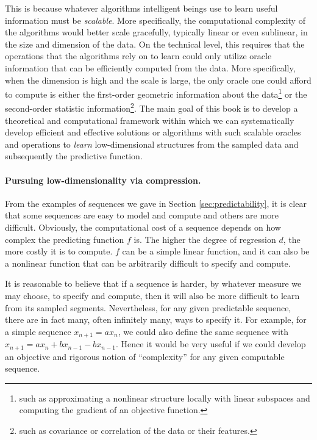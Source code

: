 \documentclass[../../book-main.tex]{subfiles}
\begin{document}
This is because whatever algorithms intelligent beings use to learn useful information must be {\em scalable}. More specifically, the computational complexity of the algorithms would better scale gracefully, typically linear or even sublinear, in the size and dimension of the data. On the technical level, this requires that the operations that the algorithms rely on to learn could only utilize oracle information that can be efficiently computed from the data. More specifically, when the dimension is high and the scale is large, the only oracle one could afford to compute is either the first-order geometric information about the data\footnote{such as approximating a nonlinear structure locally with linear subspaces and computing the gradient of an objective function.} or the second-order statistic information\footnote{such as covariance or correlation of the data or their features.}.
The main goal of this book is to develop a theoretical and computational framework within which we can systematically develop efficient and effective solutions or algorithms with such scalable oracles and operations to {\em learn} low-dimensional structures from the sampled data and subsequently the predictive function.


\paragraph{Pursuing low-dimensionality via compression.}
From the examples of sequences we gave in Section \ref{sec:predictability}, it is clear that some sequences are easy to model and compute and others are more difficult. Obviously, the computational cost of a sequence depends on how complex the predicting function $f$ is. The higher the degree of regression $d$, the more costly it is to compute. $f$ can be a simple linear function, and it can also be a nonlinear function that can be arbitrarily difficult to specify and compute. 

It is reasonable to believe that if a sequence is harder, by whatever measure we may choose, to specify and compute, then it will also be more difficult to learn from its sampled segments. Nevertheless, for any given predictable sequence, there are in fact many, often infinitely many, ways to specify it. For example, for a simple sequence $x_{n+1} = a x_{n}$, we could also define the same sequence with $x_{n+1} = a x_n + b x_{n-1} - b x_{n-1}.$
Hence it would be very useful if we could develop an objective and rigorous notion of ``complexity'' for any given computable sequence. 
\end{document}
